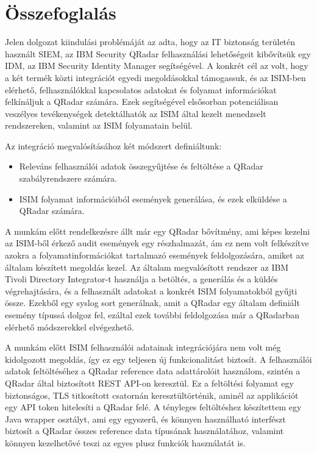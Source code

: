 \chapter{Összefoglalás}
\label{ch:sum}

Jelen dolgozat kiindulási problémáját az adta, hogy az IT biztonság területén használt SIEM, az IBM Security QRadar felhasználási lehetőségeit kibővítsük egy IDM, az IBM Security Identity Manager segítségével. A konkrét cél az volt, hogy a két termék közti integrációt egyedi megoldásokkal támogassuk, és az ISIM-ben elérhető, felhasználókkal kapcsolatos adatokat és folyamat információkat felkínáljuk a QRadar számára. Ezek segítségével elsősorban potenciálisan veszélyes tevékenységek detektálhatók az ISIM által kezelt menedzselt rendszereken, valamint az ISIM folyamatain belül.

Az integráció megvalósításához két módszert definiáltunk:
\begin{itemize}
	\item Releváns felhasználói adatok összegyűjtése és feltöltése a QRadar szabályrendszere számára.
	\item ISIM folyamat információiból események generálása, és ezek elküldése a QRadar számára.
\end{itemize}

A munkám előtt rendelkezésre állt már egy QRadar bővítmény, ami képes kezelni az ISIM-ből érkező audit események egy részhalmazát, ám ez nem volt felkészítve azokra a folyamatinformációkat tartalmazó események feldolgozására, amiket az általam készített megoldás kezel. Az általam megvalósított rendszer az IBM Tivoli Directory Integrator-t használja a betöltés, a generálás és a küldés végrehajtására, és a felhasznált adatokat a konkrét ISIM folyamatokból gyűjti össze. Ezekből egy syslog sort generálnak, amit a QRadar egy általam definiált esemény típussá dolgoz fel, ezáltal ezek további feldolgozása már a QRadarban elérhető módszerekkel elvégezhető.

A munkám előtt ISIM felhasználói adatainak integrációjára nem volt még kidolgozott megoldás, így ez egy teljesen új funkcionalitást biztosít. A felhasználói adatok feltöltéséhez a QRadar reference data adattárolóit használom, szintén a QRadar által biztosított REST API-on keresztül. Ez a feltöltési folyamat egy biztonságos, TLS titkosított csatornán keresztültörténik, aminél az applikációt egy API token hitelesíti a QRadar felé. A tényleges feltöltéshez készítettem egy Java wrapper osztályt, ami egy egyszerű, és könnyen használható interfészt biztosít a QRadar összes reference data típusának használatához, valamint könnyen kezelhetővé teszi az egyes plusz funkciók használatát is.

